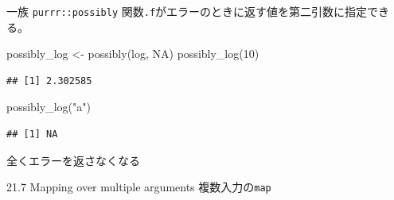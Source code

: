 \documentclass[
  ignorenonframetext,
  aspectratio=169]{beamer}
\newenvironment{Shaded}{\begin{snugshade}}{\end{snugshade}}
\newcommand{\ConstantTok}[1]{\textcolor[rgb]{0.00,0.00,0.00}{#1}}
\newcommand{\DecValTok}[1]{\textcolor[rgb]{0.00,0.00,0.81}{#1}}
\newcommand{\FunctionTok}[1]{\textcolor[rgb]{0.00,0.00,0.00}{#1}}
\newcommand{\NormalTok}[1]{#1}
\newcommand{\OtherTok}[1]{\textcolor[rgb]{0.56,0.35,0.01}{#1}}
\newcommand{\StringTok}[1]{\textcolor[rgb]{0.31,0.60,0.02}{#1}}
\begin{document}
\begin{frame}[fragile]{一族 \texttt{purrr::possibly}}
\protect\hypertarget{ux4e00ux65cf-purrrpossibly}{}
関数\texttt{.f}がエラーのときに返す値を第二引数に指定できる。

\begin{Shaded}
\begin{Highlighting}[]
\NormalTok{possibly\_log }\OtherTok{\textless{}{-}} \FunctionTok{possibly}\NormalTok{(log, }\ConstantTok{NA}\NormalTok{)}
\FunctionTok{possibly\_log}\NormalTok{(}\DecValTok{10}\NormalTok{)}
\end{Highlighting}
\end{Shaded}

\begin{verbatim}
## [1] 2.302585
\end{verbatim}

\begin{Shaded}
\begin{Highlighting}[]
\FunctionTok{possibly\_log}\NormalTok{(}\StringTok{"a"}\NormalTok{)}
\end{Highlighting}
\end{Shaded}

\begin{verbatim}
## [1] NA
\end{verbatim}

全くエラーを返さなくなる
\end{frame}

\begin{frame}[fragile]{21.7 Mapping over multiple arguments}
\protect\hypertarget{mapping-over-multiple-arguments}{}
複数入力の\texttt{map}
\end{frame}
\end{document}
